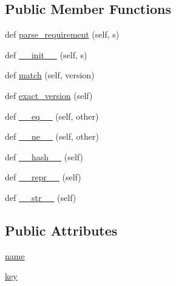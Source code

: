 \subsection*{Public Member Functions}
\begin{DoxyCompactItemize}
\item 
def \hyperlink{classpip_1_1__vendor_1_1distlib_1_1version_1_1Matcher_a742c0bfda9e1c70369b7d4c5fd9d1e66}{parse\+\_\+requirement} (self, s)
\item 
def \hyperlink{classpip_1_1__vendor_1_1distlib_1_1version_1_1Matcher_a494b2dcc99e0a81ada79bac2bf32a6d4}{\+\_\+\+\_\+init\+\_\+\+\_\+} (self, s)
\item 
def \hyperlink{classpip_1_1__vendor_1_1distlib_1_1version_1_1Matcher_abab07ac81cd23c3863693a3986eca843}{match} (self, version)
\item 
def \hyperlink{classpip_1_1__vendor_1_1distlib_1_1version_1_1Matcher_a1e0544a93b36043a3f7aa1b8f95b2f41}{exact\+\_\+version} (self)
\item 
def \hyperlink{classpip_1_1__vendor_1_1distlib_1_1version_1_1Matcher_acb2be6aef3dc033be295206a5253110f}{\+\_\+\+\_\+eq\+\_\+\+\_\+} (self, other)
\item 
def \hyperlink{classpip_1_1__vendor_1_1distlib_1_1version_1_1Matcher_a150a7ef82cfd81b9f1f83426a067bef5}{\+\_\+\+\_\+ne\+\_\+\+\_\+} (self, other)
\item 
def \hyperlink{classpip_1_1__vendor_1_1distlib_1_1version_1_1Matcher_ae8b13e5a0471c1eec5b5d5f6f072ae7e}{\+\_\+\+\_\+hash\+\_\+\+\_\+} (self)
\item 
def \hyperlink{classpip_1_1__vendor_1_1distlib_1_1version_1_1Matcher_a98143e19a5a780acb680fa860eb19093}{\+\_\+\+\_\+repr\+\_\+\+\_\+} (self)
\item 
def \hyperlink{classpip_1_1__vendor_1_1distlib_1_1version_1_1Matcher_ad4014bd7a691373d02757c72b42fa593}{\+\_\+\+\_\+str\+\_\+\+\_\+} (self)
\end{DoxyCompactItemize}
\subsection*{Public Attributes}
\begin{DoxyCompactItemize}
\item 
\hyperlink{classpip_1_1__vendor_1_1distlib_1_1version_1_1Matcher_a76fa61a6260ffbbc7c36dcf16cac4803}{name}
\item 
\hyperlink{classpip_1_1__vendor_1_1distlib_1_1version_1_1Matcher_af7de148dbf8e2020068b8c57108247b5}{key}
\end{DoxyCompactItemize}
